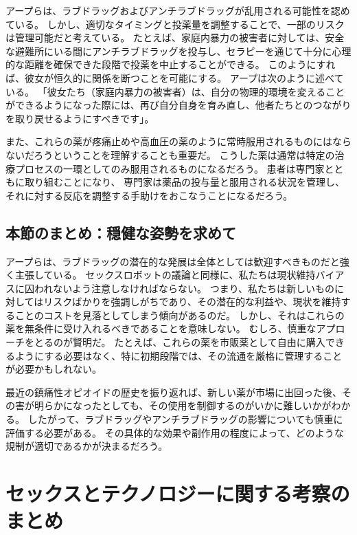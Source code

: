 \documentclass[paper=a4,book,openany]{jlreq}
\begin{document}
アープらは、ラブドラッグおよびアンチラブドラッグが乱用される可能性を認めている。
しかし、適切なタイミングと投薬量を調整することで、一部のリスクは管理可能だと考えている。
たとえば、家庭内暴力の被害者に対しては、安全な避難所にいる間にアンチラブドラッグを投与し、セラピーを通じて十分に心理的な距離を確保できた段階で投薬を中止することができる。
このようにすれば、彼女が恒久的に関係を断つことを可能にする。
アープは次のように述べている。
「彼女たち（家庭内暴力の被害者）は、自分の物理的環境を変えることができるようになった際には、再び自分自身を育み直し、他者たちとのつながりを取り戻せるようにすべきです」\citep{szalavitz14:_is_it_possib_creat_anti_love_drug}。

また、これらの薬が疼痛止めや高血圧の薬のように常時服用されるものにはならないだろうということを理解することも重要だ。
こうした薬は通常は特定の治療プロセスの一環としてのみ服用されるものになるだろう。
患者は専門家とともに取り組むことになり、
専門家は薬品の投与量と服用される状況を管理し、それに対する反応を調整する手助けをおこなうことになるだろう。

\subsection{本節のまとめ：穏健な姿勢を求めて}

アープらは、ラブドラッグの潜在的な発展は全体としては歓迎すべきものだと強く主張している。
セックスロボットの議論と同様に、私たちは現状維持バイアスに囚われないよう注意しなければならない。
つまり、私たちは新しいものに対してはリスクばかりを強調しがちであり、その潜在的な利益や、現状を維持することのコストを見落としてしまう傾向があるのだ。
しかし、それはこれらの薬を無条件に受け入れるべきであることを意味しない。
むしろ、慎重なアプローチをとるのが賢明だ。
たとえば、これらの薬を市販薬として自由に購入できるようにする必要はなく、特に初期段階では、その流通を厳格に管理することが必要かもしれない。

最近の鎮痛性オピオイドの歴史を振り返れば、新しい薬が市場に出回った後、その害が明らかになったとしても、その使用を制御するのがいかに難しいかがわかる。
したがって、ラブドラッグやアンチラブドラッグの影響についても慎重に評価する必要がある。
その具体的な効果や副作用の程度によって、どのような規制が適切であるかが決まるだろう。

\section{セックスとテクノロジーに関する考察のまとめ}
\end{document}
